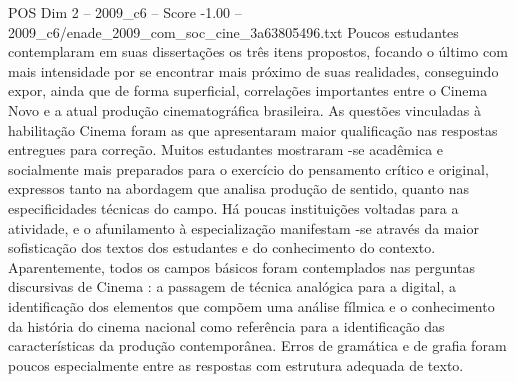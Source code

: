 \begin{textsample}{POS Dim 2 – 2009\_c6 – Score -1.00 – 2009\_c6/enade\_2009\_com\_soc\_cine\_3a63805496.txt}
Poucos estudantes contemplaram em suas dissertações os três itens propostos, focando o último com mais intensidade por se encontrar mais próximo de suas realidades, conseguindo expor, ainda que de forma superficial, correlações importantes entre o Cinema Novo e a atual produção cinematográfica brasileira.
As questões vinculadas à habilitação Cinema foram as que apresentaram maior qualificação nas respostas entregues para correção.
Muitos estudantes mostraram -se acadêmica e socialmente mais preparados para o exercício do pensamento crítico e original, expressos tanto na abordagem que analisa produção de sentido, quanto nas especificidades técnicas do campo.
Há poucas instituições voltadas para a atividade, e o afunilamento à especialização manifestam -se através da maior sofisticação dos textos dos estudantes e do conhecimento do contexto.
Aparentemente, todos os campos básicos foram contemplados nas perguntas discursivas de Cinema : a passagem de técnica analógica para a digital, a identificação dos elementos que compõem uma análise fílmica e o conhecimento da história do cinema nacional como referência para a identificação das características da produção contemporânea.
Erros de gramática e de grafia foram poucos especialmente entre as respostas com estrutura adequada de texto.

\end{textsample}
